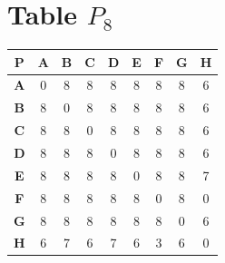 \documentclass{article}
\begin{document}
\section{Table $P_{8}$}
\begin{center}
    \begin{tabular}{|c||c|c|c|c|c|c|c|c|}
        \hline
        \textbf{P} & \textbf{A} & \textbf{B} & \textbf{C} & \textbf{D} & \textbf{E} & \textbf{F} & \textbf{G} & \textbf{H} \\
        \hline
        \hline
        \textbf{A}& 0 & \cellcolor[HTML]{D74894}$8$ & \cellcolor[HTML]{D74894}$8$ & \cellcolor[HTML]{D74894}$8$ & \cellcolor[HTML]{D74894}$8$ & \cellcolor[HTML]{D74894}$8$ & \cellcolor[HTML]{D74894}$8$ & 6 \\
        \hline
        \textbf{B}& \cellcolor[HTML]{D74894}$8$ & 0 & \cellcolor[HTML]{D74894}$8$ & \cellcolor[HTML]{D74894}$8$ & \cellcolor[HTML]{D74894}$8$ & \cellcolor[HTML]{D74894}$8$ & \cellcolor[HTML]{D74894}$8$ & 6 \\
        \hline
        \textbf{C}& \cellcolor[HTML]{D74894}$8$ & \cellcolor[HTML]{D74894}$8$ & 0 & \cellcolor[HTML]{D74894}$8$ & \cellcolor[HTML]{D74894}$8$ & \cellcolor[HTML]{D74894}$8$ & \cellcolor[HTML]{D74894}$8$ & 6 \\
        \hline
        \textbf{D}& \cellcolor[HTML]{D74894}$8$ & \cellcolor[HTML]{D74894}$8$ & \cellcolor[HTML]{D74894}$8$ & 0 & \cellcolor[HTML]{D74894}$8$ & \cellcolor[HTML]{D74894}$8$ & \cellcolor[HTML]{D74894}$8$ & 6 \\
        \hline
        \textbf{E}& \cellcolor[HTML]{D74894}$8$ & \cellcolor[HTML]{D74894}$8$ & \cellcolor[HTML]{D74894}$8$ & \cellcolor[HTML]{D74894}$8$ & 0 & \cellcolor[HTML]{D74894}$8$ & \cellcolor[HTML]{D74894}$8$ & 7 \\
        \hline
        \textbf{F}& \cellcolor[HTML]{D74894}$8$ & \cellcolor[HTML]{D74894}$8$ & \cellcolor[HTML]{D74894}$8$ & \cellcolor[HTML]{D74894}$8$ & \cellcolor[HTML]{D74894}$8$ & 0 & \cellcolor[HTML]{D74894}$8$ & 0 \\
        \hline
        \textbf{G}& \cellcolor[HTML]{D74894}$8$ & \cellcolor[HTML]{D74894}$8$ & \cellcolor[HTML]{D74894}$8$ & \cellcolor[HTML]{D74894}$8$ & \cellcolor[HTML]{D74894}$8$ & \cellcolor[HTML]{D74894}$8$ & 0 & 6 \\
        \hline
        \textbf{H}& 6 & 7 & 6 & 7 & 6 & 3 & 6 & 0 \\
        \hline
    \end{tabular}
\end{center}
\end{document}
